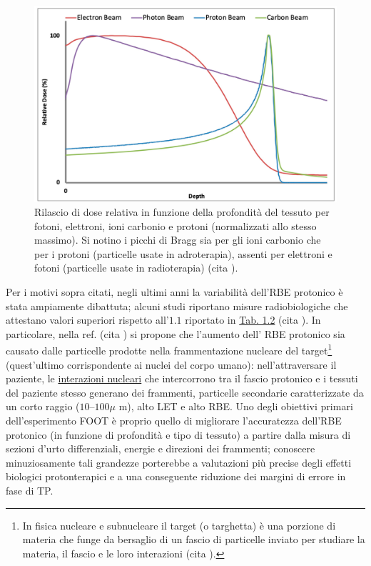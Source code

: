 \documentclass[12pt,a4paper,twoside]{report}
\begin{document}
	\begin{figure}[H]
		\centering
		\includegraphics[width=0.9\linewidth]{photon.jpg}
		\caption{Rilascio di dose relativa in funzione della profondità del tessuto per fotoni, elettroni, ioni carbonio e protoni (normalizzati allo stesso massimo). Si notino i picchi di Bragg sia per gli ioni carbonio che per i protoni (particelle usate in adroterapia), assenti per elettroni e fotoni (particelle usate in radioterapia) (cita
			).}
		\label{fig:photon}
	\end{figure}
	Per i motivi sopra citati, negli ultimi anni la variabilità dell'RBE protonico è stata ampiamente dibattuta; alcuni studi riportano misure radiobiologiche che attestano valori superiori rispetto all'$1.1$ riportato in \hyperref[tab:let_rbe]{Tab. 1.2} (cita
	). In particolare, nella ref. (cita
	) si propone che l'aumento dell' RBE protonico sia causato dalle particelle prodotte nella frammentazione nucleare del target\footnote{In fisica nucleare e subnucleare il target (o targhetta) è una porzione di materia che funge da bersaglio di un fascio di particelle inviato per studiare la materia, il fascio e le loro interazioni (cita
		).} (quest'ultimo corrispondente ai nuclei del corpo umano): nell'attraversare il paziente, le \hyperref[par:interazioni_nucleari]{interazioni nucleari} che intercorrono tra il fascio protonico e i tessuti del paziente stesso generano dei frammenti, particelle secondarie caratterizzate da un corto raggio ($10$--$100\mu\mbox{ m}$), alto LET e alto RBE. Uno degli obiettivi primari dell'esperimento FOOT è proprio quello di migliorare l'accuratezza dell'RBE protonico (in funzione di profondità e tipo di tessuto) a partire dalla misura di sezioni d'urto differenziali, energie e direzioni dei frammenti; conoscere minuziosamente tali grandezze porterebbe a valutazioni più precise degli effetti biologici protonterapici e a una conseguente riduzione dei margini di errore in fase di TP.
		
\end{document}
